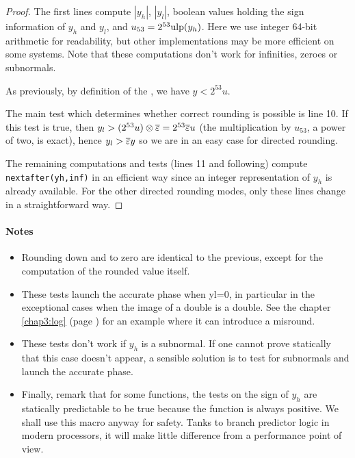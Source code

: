 \begin{proof}
  The first lines compute $|y_h|$, $|y_l|$, boolean values holding the
  sign information of $y_h$ and $y_l$, and $u_{53}=2^{53}\mbox{ulp}(y_h)$.
  Here we use integer 64-bit arithmetic for readability, but other
  implementations may be more efficient on some systems. Note that
  these computations don't work for infinities, zeroes or subnormals.
  
  As previously, by definition of the \ulp, we have  $y<2^{53}u$.
  
  The main test which determines whether correct rounding is possible
  is line 10. If this test is true, then $y_l>(2^{53}u)\otimes{\overline{\varepsilon}}
  = 2^{53}{\overline{\varepsilon}} u $ (the multiplication by $u_{53}$, a power of two,
  is exact), hence $y_l>{\overline{\varepsilon}} y$ so we are in an easy case for
  directed rounding.

  The remaining computations and tests (lines 11 and following)
  compute \texttt{nextafter(yh,inf)} in an efficient way since an
  integer representation of $y_h$ is already available. For the other
  directed rounding modes, only these lines change in a
  straightforward way.
\end{proof}





\paragraph*{Notes}
\begin{itemize}
\item Rounding down and to zero are identical to the previous, except
  for the computation of the rounded value itself.

\item These tests launch the accurate phase when yl=0, in particular
  in the exceptional cases when the image of a double is a double. See
  the chapter \ref{chap3:log} (page \pageref{pageref:log_of_one}) for
  an example where it can introduce a misround.

\item These tests don't work if $y_h$ is a subnormal. If one cannot
  prove statically that this case doesn't appear, a sensible solution
  is to test for subnormals and launch the accurate phase.

\item Finally, remark that for some functions, the tests on the sign of
  $y_h$ are statically predictable to be true because the function is
  always positive. We shall use this macro anyway for safety. Tanks to
  branch predictor logic in modern processors, it will make little
  difference from a performance point of view.
\end{itemize}









